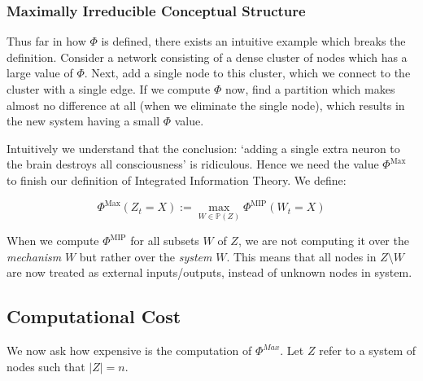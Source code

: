 \subsubsection{Maximally Irreducible Conceptual Structure}

Thus far in how $\Phi$ is defined, there exists an intuitive example which breaks the definition. Consider a network consisting of a dense cluster of nodes which has a large value of $\Phi$. Next, add a single node to this cluster, which we connect to the cluster with a single edge. If we compute $\Phi$ now, find a partition which makes almost no difference at all (when we eliminate the single node), which results in the new system having a small $\Phi$ value. 

Intuitively we understand that the conclusion: `adding a single extra neuron to the brain destroys all consciousness' is ridiculous. Hence we need the value $\Phi^{\text{Max}}$ to finish our definition of Integrated Information Theory. We define:

\begin{equation}
\label{def:Phimax}
\Phi^{\text{Max}}(Z_t = X) := \max \limits_{W \in \mathbb{P}(Z)}\Phi^{\text{MIP}} (W_t = X)
\end{equation}

\begin{remark}
	When we compute $\Phi^{\text{MIP}} $ for all subsets $W$ of $Z$, we are not computing it over the \textit{mechanism} $W$ but rather over the \textit{system} $W$. This means that all nodes in $Z \setminus W$ are now treated as external inputs/outputs, instead of unknown nodes in system.
\end{remark}

\subsection{Computational Cost}
We now ask how expensive is the computation of $\Phi^{Max}$. Let $Z$ refer to a system of nodes such that $|Z| = n$.

